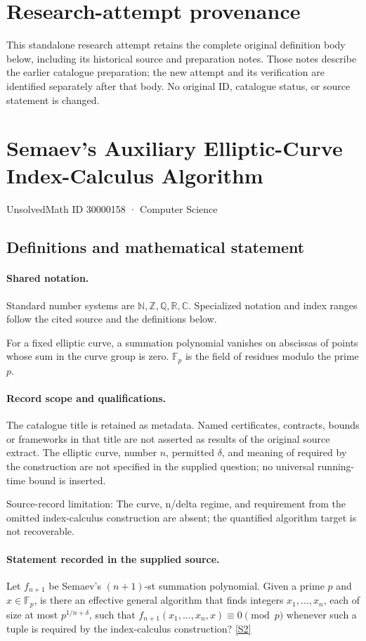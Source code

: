 \documentclass[11pt]{article}
\begin{document}
\section*{Research-attempt provenance}
This standalone research attempt retains the complete original definition body below,
including its historical source and preparation notes. Those notes describe the
earlier catalogue preparation; the new attempt and its verification are identified
separately after that body. No original ID, catalogue status, or source statement is changed.

\section{Semaev's Auxiliary Elliptic-Curve Index-Calculus Algorithm}\label{30000158}
{\small UnsolvedMath ID 30000158 · Computer Science}
\subsection{Definitions and mathematical statement}

\paragraph{Shared notation.}Standard number systems are $\mathbb N,\mathbb Z,\mathbb Q,\mathbb R,\mathbb C$. Specialized notation and index ranges follow the cited source and the definitions below.


For a fixed elliptic curve, a summation polynomial vanishes on abscissas of points whose sum in the curve group is zero. $\mathbb F_p$ is the field of residues modulo the prime $p$.
\paragraph{Record scope and qualifications.}
The catalogue title is retained as metadata. Named certificates, contracts, bounds or frameworks in that title are not asserted as results of the original source extract.
The elliptic curve, number $n$, permitted $\delta$, and meaning of required by the construction are not specified in the supplied question; no universal running-time bound is inserted.

Source-record limitation: The curve, n/delta regime, and requirement from the omitted index-calculus construction are absent; the quantified algorithm target is not recoverable.
\paragraph{Statement recorded in the supplied source.}
Let $f_{n+1}$ be Semaev's $(n+1)$-st summation polynomial. Given a prime $p$ and $x\in\mathbb{F}_p$, is there an effective general algorithm that finds integers $x_1,\ldots,x_n$, each of size at most $p^{1/n+\delta}$, such that $f_{n+1}(x_1,\ldots,x_n,x)\equiv0\pmod p$ whenever such a tuple is required by the index-calculus construction? \href{https://doi.org/10.4171/owr/2004/54}{[S2]}
\end{document}
